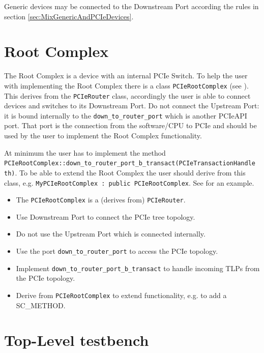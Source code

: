 Generic devices may be connected to the Downstream Port according the rules in section \ref{sec:MixGenericAndPCIeDevices}.


\section{Root Complex}

The Root Complex is a device with an internal PCIe Switch. To help the user with implementing the Root Complex there is a class \lstinline|PCIeRootComplex| (see ). This derives from the \lstinline|PCIeRouter| class, accordingly the user is able to connect devices and switches to its Downstream Port. Do not connect the Upstream Port: it is bound internally to the \lstinline|down_to_router_port| which is another PCIeAPI port. That port is the connection from the software/CPU to PCIe and should be used by the user to implement the Root Complex functionality.

At minimum the user has to implement the method \lstinline|PCIeRootComplex::down_to_router_port_b_transact(PCIeTransactionHandle th)|. To be able to extend the Root Complex the user should derive from this class, e.g. \lstinline[language=TeX]|MyPCIeRootComplex : public PCIeRootComplex|. 
See  for an example.

\begin{itemize}
  \item The \lstinline|PCIeRootComplex| is a (derives from) \lstinline|PCIeRouter|.
  \item Use Downstream Port to connect the PCIe tree topology.
  \item Do not use the Upstream Port which is connected internally.
  \item Use the port \lstinline|down_to_router_port| to access the PCIe topology.
  \item Implement \lstinline|down_to_router_port_b_transact| to handle incoming TLPs from the PCIe topology.
  \item Derive from \lstinline|PCIeRootComplex| to extend functionality, e.g. to add a SC\_METHOD.
\end{itemize}


\section{Top-Level testbench}
\label{sec:TopLevelTestbench}

